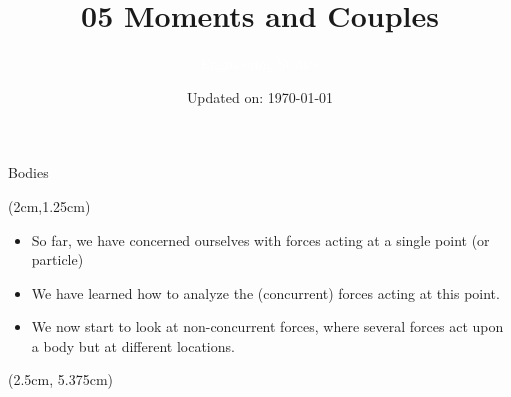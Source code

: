 \documentclass[9pt, xcolor={svgnames, x11names},professionalfonts]{beamer}
\title[Moments \& Couples]{\Huge 05 Moments and Couples}
\subtitle[Engineering Statics]{\Large\textcolor{white}{Engineering Statics}}
\author{}
\date{\small Updated on: \today}
\def\scale{1}
\begin{document}

\begin{frame}[plain]    %
	\titlepage
\end{frame}


\begin{frame}{Bodies}

	\begin{textblock*}{9cm}(2cm,1.25cm)
		\begin{itemize}
			\item So far, we have concerned ourselves with forces acting at a single point (or particle)\parm
			\item We have learned how to analyze the (concurrent) forces acting at this point.\parm
			\item We now start to look at non-concurrent forces, where several forces act upon a body but at different locations.
		\end{itemize}
	\end{textblock*}
	\begin{textblock*}{9cm}(2.5cm, 5.375cm)
		\def\scale{1}
		\centering
	\end{textblock*}
\end{frame}
\end{document}
